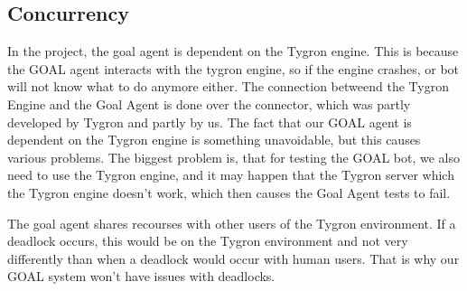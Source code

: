 \subsection{Concurrency}
In the project, the goal agent is dependent on the Tygron engine. This is because the GOAL agent interacts with the tygron engine, so if the engine crashes, or bot will not know what to do anymore either. The connection betweend the Tygron Engine and the Goal Agent is done over the connector, which was partly developed by Tygron and partly by us. The fact that our GOAL agent is dependent on the Tygron engine is something unavoidable, but this causes various problems. The biggest problem is, that for testing the GOAL bot, we also need to use the Tygron engine, and it may happen that the Tygron server which the Tygron engine doesn't work, which then causes the Goal Agent tests to fail.

The goal agent shares recourses with other users of the Tygron environment. If a deadlock occurs, this would be on the Tygron environment and not very differently than when a deadlock would occur with human users. That is why our GOAL system won't have issues with deadlocks.
\newpage
